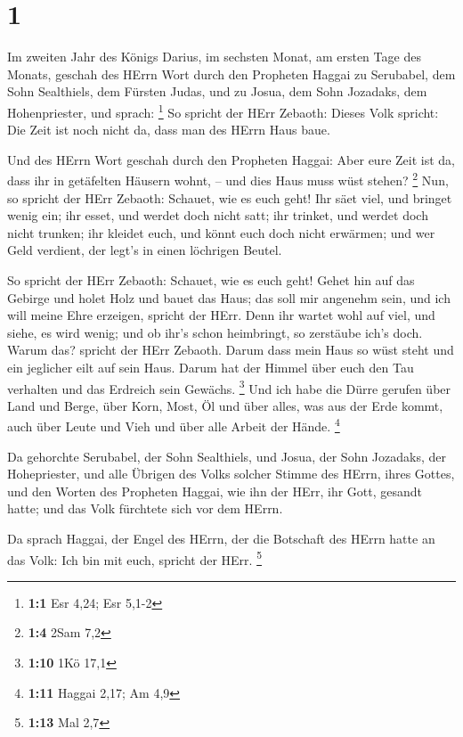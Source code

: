 \hypertarget{section}{%
\section{1}\label{section}}

 Im zweiten Jahr des Königs Darius, im sechsten Monat, am
ersten Tage des Monats, geschah des HErrn Wort durch den Propheten
Haggai zu Serubabel, dem Sohn Sealthiels, dem Fürsten Judas, und zu
Josua, dem Sohn Jozadaks, dem Hohenpriester, und sprach: \footnote{\textbf{1:1}
  Esr 4,24; Esr 5,1-2}  So spricht der HErr Zebaoth: Dieses
Volk spricht: Die Zeit ist noch nicht da, dass man des HErrn Haus baue.

 Und des HErrn Wort geschah durch den Propheten Haggai:
 Aber eure Zeit ist da, dass ihr in getäfelten Häusern
wohnt, -- und dies Haus muss wüst stehen? \footnote{\textbf{1:4} 2Sam
  7,2}  Nun, so spricht der HErr Zebaoth: Schauet, wie es
euch geht!  Ihr säet viel, und bringet wenig ein; ihr esset,
und werdet doch nicht satt; ihr trinket, und werdet doch nicht trunken;
ihr kleidet euch, und könnt euch doch nicht erwärmen; und wer Geld
verdient, der legt's in einen löchrigen Beutel.

 So spricht der HErr Zebaoth: Schauet, wie es euch geht!
 Gehet hin auf das Gebirge und holet Holz und bauet das
Haus; das soll mir angenehm sein, und ich will meine Ehre erzeigen,
spricht der HErr.  Denn ihr wartet wohl auf viel, und siehe,
es wird wenig; und ob ihr's schon heimbringt, so zerstäube ich's doch.
Warum das? spricht der HErr Zebaoth. Darum dass mein Haus so wüst steht
und ein jeglicher eilt auf sein Haus.  Darum hat der Himmel
über euch den Tau verhalten und das Erdreich sein Gewächs. \footnote{\textbf{1:10}
  1Kö 17,1}  Und ich habe die Dürre gerufen über Land und
Berge, über Korn, Most, Öl und über alles, was aus der Erde kommt, auch
über Leute und Vieh und über alle Arbeit der Hände. \footnote{\textbf{1:11}
  Haggai 2,17; Am 4,9}

 Da gehorchte Serubabel, der Sohn Sealthiels, und Josua,
der Sohn Jozadaks, der Hohepriester, und alle Übrigen des Volks solcher
Stimme des HErrn, ihres Gottes, und den Worten des Propheten Haggai, wie
ihn der HErr, ihr Gott, gesandt hatte; und das Volk fürchtete sich vor
dem HErrn.

 Da sprach Haggai, der Engel des HErrn, der die Botschaft
des HErrn hatte an das Volk: Ich bin mit euch, spricht der HErr.
\footnote{\textbf{1:13} Mal 2,7}

